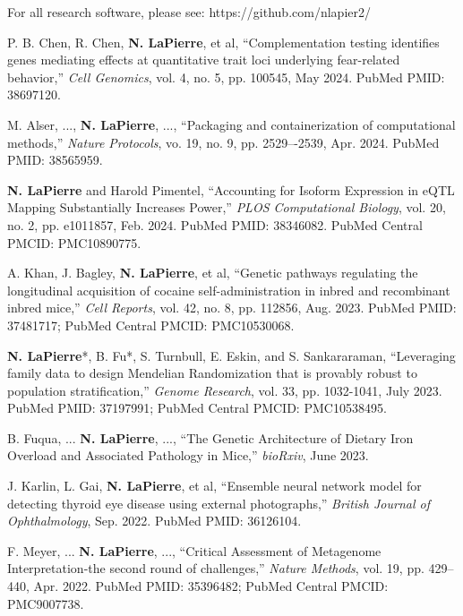 \documentclass[margin, 10pt]{res} %
\begin{document}
\begin{resume}
 



For all research software, please see: https://github.com/nlapier2/

P. B. Chen, R. Chen, \textbf{N. LaPierre}, et al, ``Complementation testing identifies genes mediating effects at quantitative trait loci underlying fear-related behavior,'' \emph{Cell Genomics}, vol. 4, no. 5, pp. 100545, May 2024. PubMed PMID: 38697120.

M. Alser, ..., \textbf{N. LaPierre}, ..., ``Packaging and containerization of computational methods,'' \emph{Nature Protocols}, vo. 19, no. 9, pp. 2529–-2539, Apr. 2024. PubMed PMID: 38565959.

\textbf{N. LaPierre} and Harold Pimentel, ``Accounting for Isoform Expression in eQTL Mapping Substantially Increases Power,'' \emph{PLOS Computational Biology}, vol. 20, no. 2, pp. e1011857, Feb. 2024. PubMed PMID: 38346082. PubMed Central PMCID: PMC10890775.

A. Khan, J. Bagley, \textbf{N. LaPierre}, et al, ``Genetic pathways regulating the longitudinal acquisition of cocaine self-administration in inbred and recombinant inbred mice,'' \emph{Cell Reports}, vol. 42, no. 8, pp. 112856, Aug. 2023.  PubMed PMID: 37481717; PubMed Central PMCID: PMC10530068.  

\textbf{N. LaPierre}*, B. Fu*, S. Turnbull, E. Eskin, and S. Sankararaman, ``Leveraging family data to design Mendelian Randomization that is provably robust to population stratification,'' \emph{Genome Research}, vol. 33, pp. 1032-1041, July 2023.  PubMed PMID: 37197991; PubMed Central PMCID: PMC10538495.

B. Fuqua, ... \textbf{N. LaPierre}, ..., ``The Genetic Architecture of Dietary Iron Overload and Associated Pathology in Mice,'' \emph{bioRxiv}, June 2023.

J. Karlin, L. Gai, \textbf{N. LaPierre}, et al, ``Ensemble neural network model for detecting thyroid eye disease using external photographs,'' \emph{British Journal of Ophthalmology}, Sep. 2022.  PubMed PMID: 36126104.

F. Meyer, ... \textbf{N. LaPierre}, ..., ``Critical Assessment of Metagenome Interpretation-the second round of challenges,'' \emph{Nature Methods}, vol. 19, pp. 429–440, Apr. 2022.  PubMed PMID: 35396482; PubMed Central PMCID: PMC9007738.


\end{resume}
\end{document}
